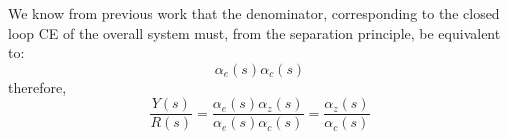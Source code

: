 We know from previous work that the denominator, corresponding to the closed loop CE of the overall system must, from the separation principle, be equivalent to:
\[
\alpha_e(s)\alpha_c(s)
\]
therefore,
\[
\frac{{Y(s)}}{{R(s)}} = \frac{{\alpha _e (s)\alpha _z (s)}}{{\alpha _e (s)\alpha _c (s)}} = \frac{{\alpha _z (s)}}{{\alpha _c (s)}}
\]



\endinput

